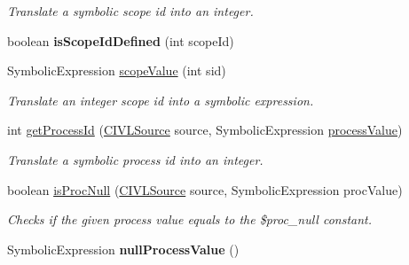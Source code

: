 \begin{DoxyCompactItemize}
\begin{DoxyCompactList}\small\item\em Translate a symbolic scope id into an integer. \end{DoxyCompactList}\item 
\hypertarget{interfaceedu_1_1udel_1_1cis_1_1vsl_1_1civl_1_1model_1_1IF_1_1ModelFactory_addabae5a71228ce9fc5b619ba128d580}{}boolean {\bfseries is\+Scope\+Id\+Defined} (int scope\+Id)\label{interfaceedu_1_1udel_1_1cis_1_1vsl_1_1civl_1_1model_1_1IF_1_1ModelFactory_addabae5a71228ce9fc5b619ba128d580}

\item 
Symbolic\+Expression \hyperlink{interfaceedu_1_1udel_1_1cis_1_1vsl_1_1civl_1_1model_1_1IF_1_1ModelFactory_a14d322afed3a086d466b7712a9dec0b2}{scope\+Value} (int sid)
\begin{DoxyCompactList}\small\item\em Translate an integer scope id into a symbolic expression. \end{DoxyCompactList}\item 
int \hyperlink{interfaceedu_1_1udel_1_1cis_1_1vsl_1_1civl_1_1model_1_1IF_1_1ModelFactory_a2c42f0b933f3b0521f144c23a0f27e27}{get\+Process\+Id} (\hyperlink{interfaceedu_1_1udel_1_1cis_1_1vsl_1_1civl_1_1model_1_1IF_1_1CIVLSource}{C\+I\+V\+L\+Source} source, Symbolic\+Expression \hyperlink{interfaceedu_1_1udel_1_1cis_1_1vsl_1_1civl_1_1model_1_1IF_1_1ModelFactory_ac9c2af3dabac564bbcfb9ea8af132698}{process\+Value})
\begin{DoxyCompactList}\small\item\em Translate a symbolic process id into an integer. \end{DoxyCompactList}\item 
boolean \hyperlink{interfaceedu_1_1udel_1_1cis_1_1vsl_1_1civl_1_1model_1_1IF_1_1ModelFactory_a5d1ce2f041cf6c4fbd6650e42ff54702}{is\+Proc\+Null} (\hyperlink{interfaceedu_1_1udel_1_1cis_1_1vsl_1_1civl_1_1model_1_1IF_1_1CIVLSource}{C\+I\+V\+L\+Source} source, Symbolic\+Expression proc\+Value)
\begin{DoxyCompactList}\small\item\em Checks if the given process value equals to the \$proc\+\_\+null constant. \end{DoxyCompactList}\item 
\hypertarget{interfaceedu_1_1udel_1_1cis_1_1vsl_1_1civl_1_1model_1_1IF_1_1ModelFactory_a66bc5a9c316a431152f1f3689543e14d}{}Symbolic\+Expression {\bfseries null\+Process\+Value} ()\label{interfaceedu_1_1udel_1_1cis_1_1vsl_1_1civl_1_1model_1_1IF_1_1ModelFactory_a66bc5a9c316a431152f1f3689543e14d}


\end{DoxyCompactItemize}
